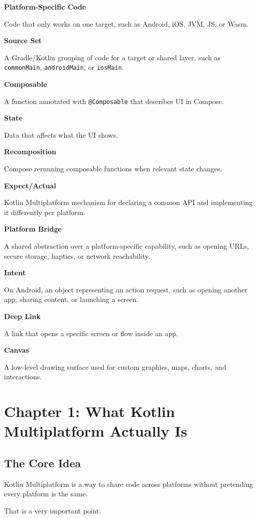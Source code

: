 \documentclass[11pt,a4paper]{article}
\begin{document}
\textbf{Platform-Specific Code}

Code that only works on one target, such as Android, iOS, JVM, JS, or Wasm.

\textbf{Source Set}

A Gradle/Kotlin grouping of code for a target or shared layer, such as \texttt{commonMain}, \texttt{androidMain}, or \texttt{iosMain}.

\textbf{Composable}

A function annotated with \texttt{@Composable} that describes UI in Compose.

\textbf{State}

Data that affects what the UI shows.

\textbf{Recomposition}

Compose rerunning composable functions when relevant state changes.

\textbf{Expect/Actual}

Kotlin Multiplatform mechanism for declaring a common API and implementing it differently per platform.

\textbf{Platform Bridge}

A shared abstraction over a platform-specific capability, such as opening URLs, secure storage, haptics, or network reachability.

\textbf{Intent}

On Android, an object representing an action request, such as opening another app, sharing content, or launching a screen.

\textbf{Deep Link}

A link that opens a specific screen or flow inside an app.

\textbf{Canvas}

A low-level drawing surface used for custom graphics, maps, charts, and interactions.

\section{Chapter 1: What Kotlin Multiplatform Actually Is}

\subsection{The Core Idea}

Kotlin Multiplatform is a way to share code across platforms without pretending every platform is the same.

That is a very important point.
\end{document}
